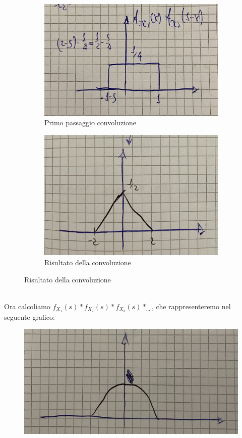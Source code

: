 \documentclass{article}
\begin{document}
\begin{figure}[ht]
  \begin{subfigure}{.5\textwidth}
  \centering
    \includegraphics[width=.9\linewidth]{images/85.jpeg}
    \caption{Primo passaggio convoluzione}
  \end{subfigure}
  \begin{subfigure}{.5\textwidth}
  \centering
    \includegraphics[width=.9\linewidth]{images/86.jpeg}
    \caption{Risultato della convoluzione}
  \end{subfigure}
\end{figure} ~\\
Ora calcoliamo $f_{X_1}(s)*f_{X_2}(s)*f_{X_3}(s)* _{\dots}$, che rappresenteremo nel seguente grafico:
\begin{figure}[ht]
\centering
\includegraphics[scale=0.13]{images/87.jpeg}
\end{figure} ~\\
\end{document}
